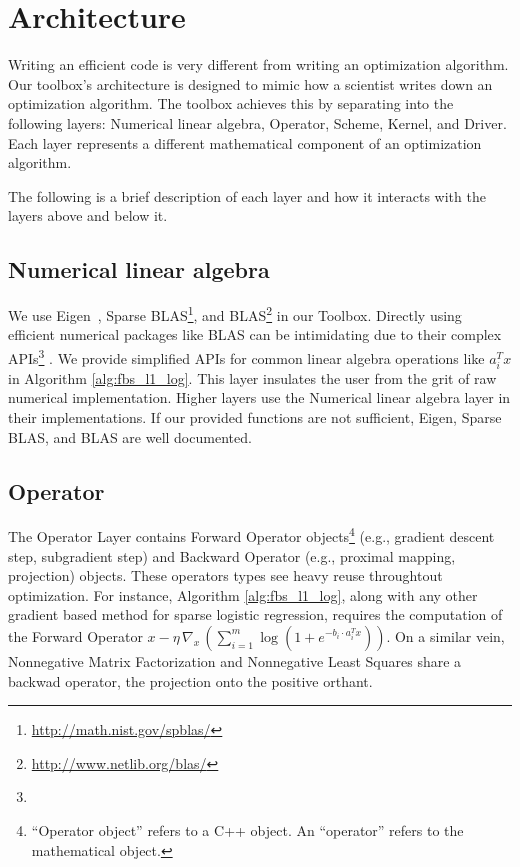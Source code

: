 \section{Architecture}


Writing an efficient code is very different from writing an optimization algorithm.
Our toolbox's architecture is designed to mimic how a scientist writes down an optimization algorithm.
The toolbox achieves this by separating into the following layers: Numerical linear algebra, Operator, Scheme, Kernel, and Driver.
Each layer represents a different mathematical component of an optimization algorithm.


The following is a brief description of each layer and how it interacts with the layers above and below it. 

\subsection{Numerical linear algebra}

We use Eigen~\citep{eigenweb}, Sparse BLAS\footnote{\url{http://math.nist.gov/spblas/}}, and BLAS\footnote{\url{http://www.netlib.org/blas/}} in our Toolbox.
Directly using efficient numerical packages like BLAS can be intimidating due to their complex APIs\footnote{} . We provide simplified APIs for common linear algebra operations like $a_i^T x$ in Algorithm \ref{alg:fbs_l1_log}. This layer insulates the user from the grit of raw numerical implementation. Higher layers use the Numerical linear algebra layer in their implementations.
If our provided functions are not sufficient, Eigen, Sparse BLAS, and BLAS are well documented. 

\subsection{Operator}

The Operator Layer contains Forward Operator objects\footnote{``Operator object'' refers to a C++ object. An ``operator'' refers to the mathematical object.} (e.g., gradient descent step, subgradient step) and Backward Operator (e.g., proximal mapping, projection) objects. These operators types see heavy reuse throughtout optimization.
For instance, Algorithm \ref{alg:fbs_l1_log}, along with any other gradient based method for sparse logistic regression, requires the computation of the Forward Operator $x - \eta \, \nabla_x \,(\sum_{i = 1}^m \log (1 + e^{-b_i \cdot a_i^T x}))$. On a similar vein, Nonnegative Matrix Factorization and Nonnegative Least Squares share a backwad operator, the projection onto the positive orthant.

